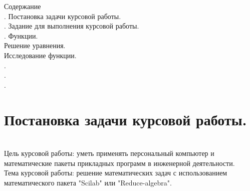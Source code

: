 \documentclass[russian, utf8, nocolumnxxxi, nocolumnxxxii, 14pt]{eskdtext}
\begin{document}
\maketitle
\newpage
Содержание\\
. Постановка задачи курсовой работы.\\
. Задание для выполнения курсовой работы.\\
. Функции.\\
 Решение уравнения.\\
 Исследование функции.\\
.\\
.\\
.\\

\newpage
\section{Постановка задачи курсовой работы.} \\
\indent Цель курсовой работы: уметь применять персональный компьютер и
математические пакеты прикладных программ в инженерной деятельности.\\
\indent Тема курсовой работы: решение математических задач с использованием математического пакета "Scilab" или "Reduce-algebra".
\newpage
\end{document}

